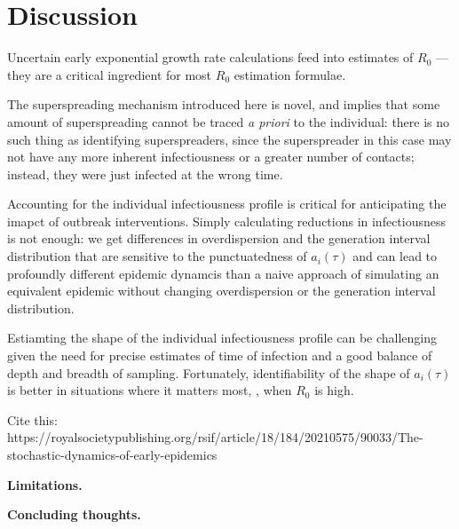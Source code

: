 \clearpage

\section{Discussion}

Uncertain early exponential growth rate calculations feed into estimates of $R_0$ --- they are a critical ingredient for most $R_0$ estimation formulae. 

The superspreading mechanism introduced here is novel, and implies that some amount of superspreading cannot be traced {\it a priori} to the individual: there is no such thing as identifying superspreaders, since the superspreader in this case may not have any more inherent infectiousness or a greater number of contacts; instead, they were just infected at the wrong time. 

Accounting for the individual infectiousness profile is critical for anticipating the imapct of outbreak interventions. Simply calculating reductions in infectiousness is not enough: we get differences in overdispersion and the generation interval distribution that are sensitive to the punctuatedness of $a_i(\tau)$ and can lead to profoundly different epidemic dynamcis than a naive approach of simulating an equivalent epidemic without changing overdispersion or the generation interval distribution. 

Estiamting the shape of the individual infectiousness profile can be challenging given the need for precise estimates of time of infection and a good balance of depth and breadth of sampling. Fortunately, identifiability of the shape of $a_i(\tau)$ is better in situations where it matters most, \ie, when $R_0$ is high. 

Cite this: https://royalsocietypublishing.org/rsif/article/18/184/20210575/90033/The-stochastic-dynamics-of-early-epidemics

{\bf Limitations.}

{\bf Concluding thoughts.}